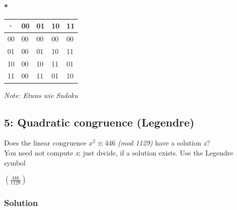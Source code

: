 \documentclass[11pt]{article}
\begin{document}
\textbf{*}

\begin{longtable}[]{@{}lllll@{}}
\toprule
· & 00 & 01 & 10 & 11\tabularnewline
\midrule
\endhead
00 & 00 & 00 & 00 & 00\tabularnewline
01 & 00 & 01 & 10 & 11\tabularnewline
10 & 00 & 10 & 11 & 01\tabularnewline
11 & 00 & 11 & 01 & 10\tabularnewline
\bottomrule
\end{longtable}

\emph{Note: Etwas wie Sudoku}

    \hypertarget{quadratic-congruence-legendre}{%
\subsection{5: Quadratic congruence
(Legendre)}\label{quadratic-congruence-legendre}}

Does the linear congruence \(x^{2} \equiv 446\) \emph{(mod 1129)} have a
solution \emph{x}?\\
You need not compute \emph{x}; just decide, if a solution exists. Use
the Legendre symbol

\((\frac{446}{1129})\)

\hypertarget{solution}{%
\subsubsection{Solution}\label{solution}}
\end{document}
